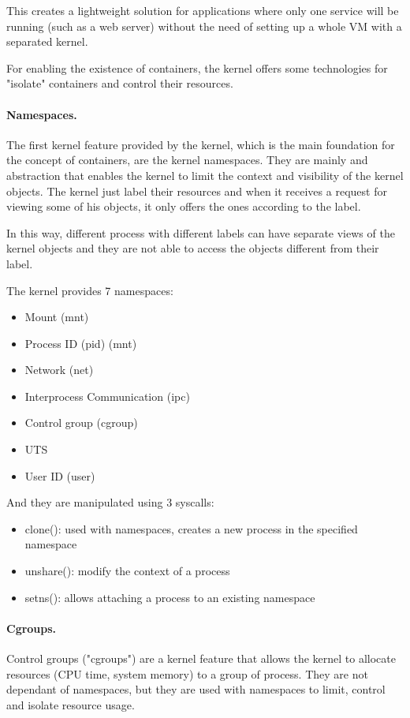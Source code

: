 This creates a lightweight solution for applications where only one service will be running (such as a web server) without the need of setting up a whole VM with a separated kernel.

For enabling the existence of containers, the kernel offers some technologies for "isolate" containers and control their resources.

\paragraph{Namespaces.} The first kernel feature provided by the kernel, which is the main foundation for the concept of containers, are the kernel namespaces.
They are mainly and abstraction that enables the kernel to limit the context and visibility of the kernel objects. The kernel just label their resources and when it receives a request for viewing some of his objects, it only offers the ones according to the label.

In this way, different process with different labels can have separate views of the kernel objects and they are not able to access the objects different from their label.

The kernel provides 7 namespaces:
\begin{itemize}
	\item{Mount (mnt)}
	\item{Process ID (pid) (mnt)}
	\item{Network (net)}
	\item{Interprocess Communication (ipc)}
	\item{Control group (cgroup)}
	\item{UTS}
	\item{User ID (user)}
\end{itemize}

And they are manipulated using 3 syscalls:
\begin{itemize}
	\item{clone(): used with namespaces, creates a new process in the specified namespace}
	\item{unshare(): modify the context of a process}
	\item{setns(): allows attaching a process to an existing namespace}
\end{itemize}

\paragraph{Cgroups.} Control groups ("cgroups") are a kernel feature that allows the kernel to allocate resources (CPU time, system memory) to a group of process. They are not dependant of namespaces, but they are used with namespaces to limit, control and isolate resource usage.

